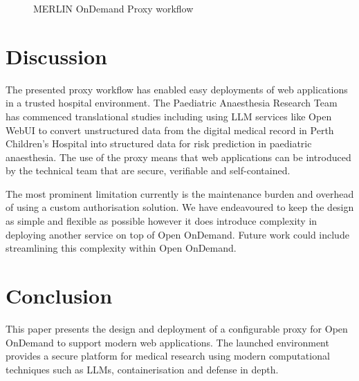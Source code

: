 \documentclass[sigconf,authordraft]{acmart}
\begin{document}
\begin{figure}[H]
\caption{MERLIN OnDemand Proxy workflow}
\end{figure}

\section{Discussion}
The presented proxy workflow has enabled easy deployments of web applications in a trusted hospital environment. The Paediatric Anaesthesia Research Team has commenced translational studies including using LLM services like Open WebUI to convert unstructured data from the digital medical record in Perth Children's Hospital into structured data for risk prediction in paediatric anaesthesia. The use of the proxy means that web applications can be introduced by the technical team that are secure, verifiable and self-contained.

The most prominent limitation currently is the maintenance burden and overhead of using a custom authorisation solution. We have endeavoured to keep the design as simple and flexible as possible however it does introduce complexity in deploying another service on top of Open OnDemand. Future work could include streamlining this complexity within Open OnDemand.

\section{Conclusion}
This paper presents the design and deployment of a configurable proxy for Open OnDemand to support modern web applications. The launched environment provides a secure platform for medical research using modern computational techniques such as LLMs, containerisation and defense in depth.
\end{document}
